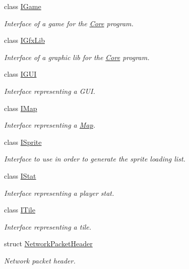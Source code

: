 \begin{DoxyCompactItemize}
class \hyperlink{classarcade_1_1_i_game}{I\-Game}
\begin{DoxyCompactList}\small\item\em Interface of a game for the \hyperlink{classarcade_1_1_core}{Core} program. \end{DoxyCompactList}\item 
class \hyperlink{classarcade_1_1_i_gfx_lib}{I\-Gfx\-Lib}
\begin{DoxyCompactList}\small\item\em Interface of a graphic lib for the \hyperlink{classarcade_1_1_core}{Core} program. \end{DoxyCompactList}\item 
class \hyperlink{classarcade_1_1_i_g_u_i}{I\-G\-U\-I}
\begin{DoxyCompactList}\small\item\em Interface representing a G\-U\-I. \end{DoxyCompactList}\item 
class \hyperlink{classarcade_1_1_i_map}{I\-Map}
\begin{DoxyCompactList}\small\item\em Interface representing a \hyperlink{classarcade_1_1_map}{Map}. \end{DoxyCompactList}\item 
class \hyperlink{classarcade_1_1_i_sprite}{I\-Sprite}
\begin{DoxyCompactList}\small\item\em Interface to use in order to generate the sprite loading list. \end{DoxyCompactList}\item 
class \hyperlink{classarcade_1_1_i_stat}{I\-Stat}
\begin{DoxyCompactList}\small\item\em Interface representing a player stat. \end{DoxyCompactList}\item 
class \hyperlink{classarcade_1_1_i_tile}{I\-Tile}
\begin{DoxyCompactList}\small\item\em Interface representing a tile. \end{DoxyCompactList}\item 
struct \hyperlink{structarcade_1_1_network_packet_header}{Network\-Packet\-Header}
\begin{DoxyCompactList}\small\item\em Network packet header. \end{DoxyCompactList}\item 

\end{DoxyCompactItemize}
